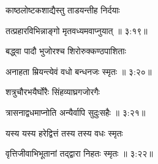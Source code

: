 {\devanagarifont काष्ठलोष्टकशाद्यैस्तु ताडयन्तीह निर्दयाः \thinspace{\dandab} \dontdisplaylinenum }%


{\devanagarifont तत्प्रहारविभिन्नाङ्गो मृतवध्यमवाप्नुयात् {॥ ३:१९॥} \veg\dontdisplaylinenum }%

{\devanagarifont बद्ध्वा पादौ भुजोरश्च शिरोरुक्कण्ठपाशिताः \thinspace{\dandab} \dontdisplaylinenum }%


{\devanagarifont अनाहता म्रियन्त्येवं वधो बन्धनजः स्मृतः {॥ ३:२०॥} \veg\dontdisplaylinenum }%

\vfill
\pageparbreak
\vers

{\devanagarifont शत्रुचौरभयैर्घोरैः सिंहव्याघ्रगजोरगैः \thinspace{\dandab} \dontdisplaylinenum }%


{\devanagarifont त्रासनाद्वधमाप्नोति अन्यैर्वापि सुदुःसहैः {॥ ३:२१॥} \veg\dontdisplaylinenum }%

{\devanagarifont यस्य यस्य हरेद्वित्तं तस्य तस्य वधः स्मृतः \thinspace{\dandab} \dontdisplaylinenum }%


{\devanagarifont वृत्तिजीवाभिभूतानां तद्द्वारा निहतः स्मृतः {॥ ३:२२॥} \veg\dontdisplaylinenum }%

